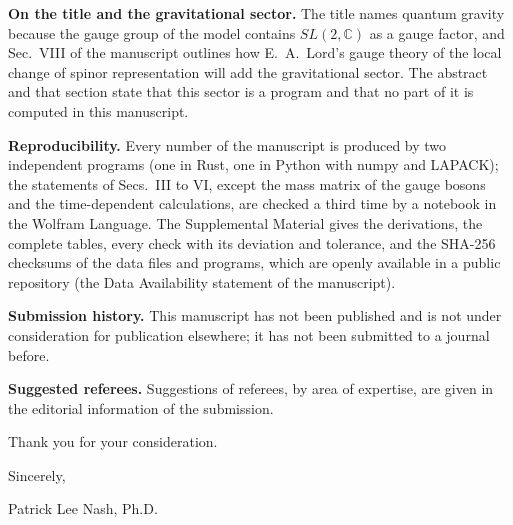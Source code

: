 \documentclass[11pt]{article}
\begin{document}
\textbf{On the title and the gravitational sector.} The title names quantum gravity because the gauge group of the model
contains $SL(2,\mathbb C)$ as a gauge factor, and Sec.~VIII of the manuscript outlines how E.~A.~Lord's gauge theory of the
local change of spinor representation will add the gravitational sector. The abstract and that section state that this
sector is a program and that no part of it is computed in this manuscript.

\textbf{Reproducibility.} Every number of the manuscript is produced by two independent programs (one in Rust, one in
Python with numpy and LAPACK); the statements of Secs.~III to VI, except the mass matrix of the gauge bosons and the
time-dependent calculations, are checked a third time by a notebook in the Wolfram Language. The Supplemental Material
gives the derivations, the complete tables, every check with its deviation and tolerance, and the SHA-256 checksums of the
data files and programs, which are openly available in a public repository (the Data Availability statement of the
manuscript).

\textbf{Submission history.} This manuscript has not been published and is not under consideration for publication
elsewhere; it has not been submitted to a journal before.

\textbf{Suggested referees.} Suggestions of referees, by area of expertise, are given in the editorial information of
the submission.

Thank you for your consideration.

Sincerely,

Patrick Lee Nash, Ph.D.
\end{document}
